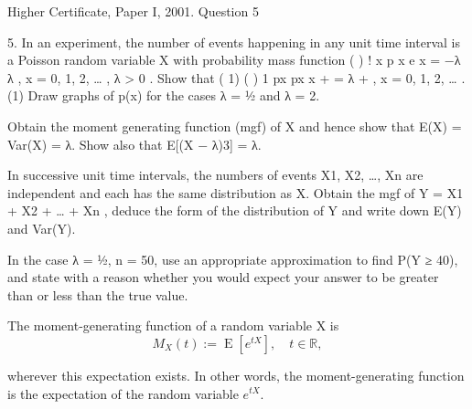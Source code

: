 \documentclass[a4paper,12pt]{article}
\begin{document}
Higher Certificate, Paper I, 2001. Question 5
\begin{framed}


5. In an experiment, the number of events happening in any unit time interval is a
Poisson random variable X with probability mass function
( ) !
x
p x e
x
= −λ λ , x = 0, 1, 2, … , λ > 0 .
Show that
( 1) ( )
1
px px
x
+ = λ
+
, x = 0, 1, 2, … .
(1)
Draw graphs of p(x) for the cases λ = ½ and λ = 2.

Obtain the moment generating function (mgf) of X and hence show that
E(X) = Var(X) = λ. Show also that E[(X − λ)3] = λ.

In successive unit time intervals, the numbers of events X1, X2, …, Xn are
independent and each has the same distribution as X. Obtain the mgf of
Y = X1 + X2 + … + Xn , deduce the form of the distribution of Y and write down
E(Y) and Var(Y).

In the case λ = ½, n = 50, use an appropriate approximation to find P(Y ≥ 40), and
state with a reason whether you would expect your answer to be greater than or
less than the true value.


\end{framed}


\begin{framed}
\noindent The moment-generating function of a random variable X is 
\[{\displaystyle M_{X}(t):=\operatorname{E} \left[e^{tX}\right],\quad t\in \mathbb{R} ,} \]

\noindent wherever this expectation exists. In other words, the moment-generating function is the expectation of the random variable 
${\displaystyle e^{tX}}. $
  \end{framed}
\end{document}
